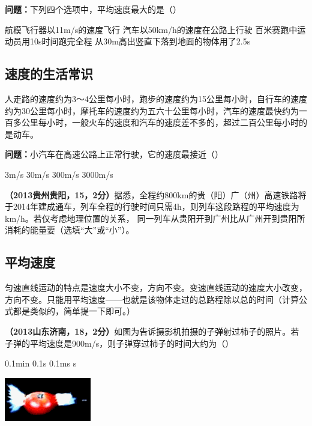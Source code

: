\documentclass[12pt]{exam}%
\begin{document}
\begin{knowledge}
\textbf{问题：}下列四个选项中，平均速度最大的是（\answerline*[B]）
\begin{choices}
\choice 航模飞行器以11m/s的速度飞行 
\choice 汽车以50km/h的速度在公路上行驶
\choice 百米赛跑中运动员用10s时间跑完全程
\choice 从30m高出竖直下落到地面的物体用了2.5s
\end{choices}

\subsection{速度的生活常识}
人走路的速度约为3～4公里每小时，跑步的速度约为15公里每小时，自行车的速度约为30公里每小时，摩托车的速度约为五六十公里每小时，汽车的速度最快约为一百多公里每小时，一般火车的速度和汽车的速度差不多的，超过二百公里每小时的是动车。


\textbf{问题：}小汽车在高速公路上正常行驶，它的速度最接近（\answerline*[B]）

\begin{oneparchoices}
\choice 3m/s
\choice 30m/s
\choice 300m/s
\choice 3000m/s
\end{oneparchoices}

\textbf{（2013贵州贵阳，15，2分）}据悉，全程约800km的贵（阳）广（州）高速铁路将于2014年建成通车，列车全程的行驶时间只需4h，则列车这段路程的平均速度为\answerline*[200]km/h。若仅考虑地理位置的关系， 同一列车从贵阳开到广州比从广州开到贵阳所消耗的能量要\answerline*[小]（选填“大”或“小”）。



\subsection{平均速度}
匀速直线运动的特点是速度大小不变，方向不变。变速直线运动的速度大小改变，方向不变。只能用平均速度——也就是该物体走过的总路程除以总的时间（计算公式都是类似的，简单提一下即可。）

\textbf{（2013山东济南，18，2分）}如图为告诉摄影机拍摄的子弹射过柿子的照片。若子弹的平均速度是900m/s，则子弹穿过柿子的时间大约为（\answerline*[C]）

\begin{multicols}{2}
\begin{choices}
\choice 0.1min
\choice 0.1s
\choice 0.1ms
\si{\micro}s
\end{choices}
\columnbreak
\includegraphics[scale=1]{figures/子弹穿过柿子.png} 
\end{multicols}


\end{knowledge}
\end{document}

